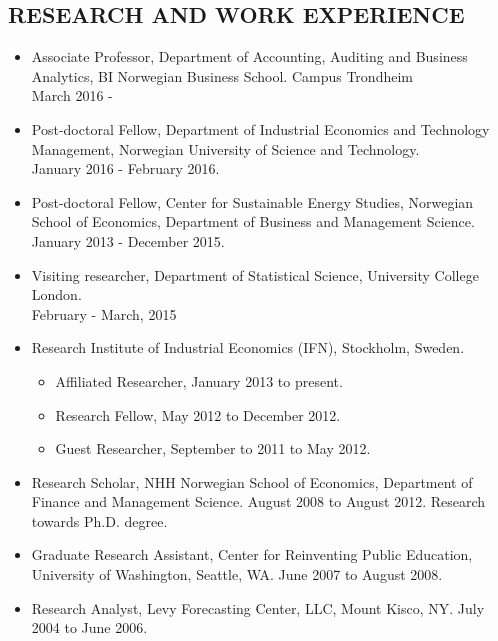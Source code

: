 \documentclass[margin]{res}
\begin{document}
\begin{resume}
\section{RESEARCH AND WORK EXPERIENCE}
                  \begin{itemize}
                  \setlength{\itemsep}{10pt}
                  \item[] Associate Professor, Department of Accounting, Auditing and Business Analytics, BI Norwegian Business School. Campus Trondheim \\ March 2016 -
                  \item[] Post-doctoral Fellow, Department of Industrial Economics and Technology Management, Norwegian University of Science and Technology. \\ January 2016 - February 2016.
                  \item[] Post-doctoral Fellow, Center for Sustainable Energy Studies, Norwegian School of Economics, Department of Business and Management Science. \\ January 2013 - December 2015.
                  \item[] Visiting researcher, Department of Statistical Science, University College London. \\ February - March, 2015
                  \item[] Research Institute of Industrial Economics (IFN), Stockholm, Sweden.
                    \begin{itemize}
                    \item[] Affiliated Researcher, January 2013 to present.
                    \item[] Research Fellow, May 2012 to December 2012.
                    \item[] Guest Researcher, September to 2011 to May 2012.
                    \end{itemize}
                  \item[] Research Scholar, NHH Norwegian School of Economics, Department of Finance and Management Science. August 2008 to August 2012.
                  Research towards Ph.D. degree.
                  \item[] Graduate Research Assistant, Center for Reinventing Public Education, University of Washington, Seattle, WA. June 2007 to August 2008.
                  \item[] Research Analyst, Levy Forecasting Center, LLC, Mount Kisco, NY. July 2004 to June 2006.
                  \end{itemize}


\end{resume}
\end{document}
